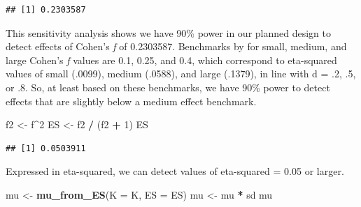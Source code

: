 \documentclass[]{book}
\newenvironment{Shaded}{\begin{snugshade}}{\end{snugshade}}
\newcommand{\CommentTok}[1]{\textcolor[rgb]{0.56,0.35,0.01}{\textit{#1}}}
\newcommand{\DataTypeTok}[1]{\textcolor[rgb]{0.13,0.29,0.53}{#1}}
\newcommand{\DecValTok}[1]{\textcolor[rgb]{0.00,0.00,0.81}{#1}}
\newcommand{\FloatTok}[1]{\textcolor[rgb]{0.00,0.00,0.81}{#1}}
\newcommand{\KeywordTok}[1]{\textcolor[rgb]{0.13,0.29,0.53}{\textbf{#1}}}
\newcommand{\NormalTok}[1]{#1}
\newcommand{\OperatorTok}[1]{\textcolor[rgb]{0.81,0.36,0.00}{\textbf{#1}}}
\newcommand{\StringTok}[1]{\textcolor[rgb]{0.31,0.60,0.02}{#1}}
\begin{document}
\begin{Shaded}
\end{Shaded}

\begin{verbatim}
## [1] 0.2303587
\end{verbatim}

This sensitivity analysis shows we have 90\% power in our planned design to detect effects of Cohen's \emph{f} of 0.2303587. Benchmarks by \citet{cohen1988spa} for small, medium, and large Cohen's \emph{f} values are 0.1, 0.25, and 0.4, which correspond to eta-squared values of small (.0099), medium (.0588), and large (.1379), in line with d = .2, .5, or .8. So, at least based on these benchmarks, we have 90\% power to detect effects that are slightly below a medium effect benchmark.

\begin{Shaded}
\begin{Highlighting}[]
\NormalTok{f2 <-}\StringTok{ }\NormalTok{f}\OperatorTok{^}\DecValTok{2}
\NormalTok{ES <-}\StringTok{ }\NormalTok{f2 }\OperatorTok{/}\StringTok{ }\NormalTok{(f2 }\OperatorTok{+}\StringTok{ }\DecValTok{1}\NormalTok{)}
\NormalTok{ES}
\end{Highlighting}
\end{Shaded}

\begin{verbatim}
## [1] 0.0503911
\end{verbatim}

Expressed in eta-squared, we can detect values of eta-squared = 0.05 or larger.

\begin{Shaded}
\begin{Highlighting}[]
\NormalTok{mu <-}\StringTok{ }\KeywordTok{mu_from_ES}\NormalTok{(}\DataTypeTok{K =}\NormalTok{ K, }\DataTypeTok{ES =}\NormalTok{ ES)}
\NormalTok{mu <-}\StringTok{ }\NormalTok{mu }\OperatorTok{*}\StringTok{ }\NormalTok{sd}
\NormalTok{mu}
\end{Highlighting}
\end{Shaded}
\end{document}
